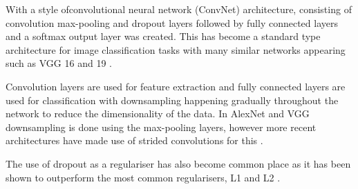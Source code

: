 With \cite{krizhevsky2012imagenet} a style ofconvolutional neural network (ConvNet) architecture, consisting of convolution max-pooling and dropout layers followed by fully connected layers and a softmax output layer was created. This has become a standard type architecture for image classification tasks with many similar networks appearing such as VGG 16 and 19 \cite{simonyan2014very}.

Convolution layers are used for feature extraction and fully connected layers are used for classification with downsampling happening gradually throughout the network to reduce the dimensionality of the data. In AlexNet and VGG downsampling is done using the max-pooling layers, however more recent architectures have made use of strided convolutions for this \cite{springenberg2014striving}.

The use of dropout as a regulariser has also become common place as it has been shown to outperform the most common regularisers, L1 and L2 \cite{srivastava2014dropout}.

